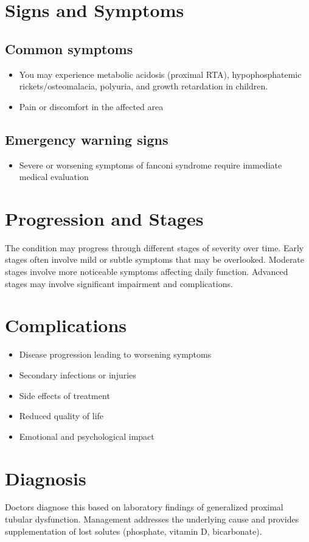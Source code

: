 \section{Signs and Symptoms}

\subsection{Common symptoms}
\begin{itemize}[noitemsep]
  \item You may experience metabolic acidosis (proximal RTA), hypophosphatemic rickets/osteomalacia, polyuria, and growth retardation in children.

  \item Pain or discomfort in the affected area
  \end{itemize}

\subsection{Emergency warning signs}
\begin{itemize}[noitemsep]
  \item Severe or worsening symptoms of fanconi syndrome require immediate medical evaluation
\end{itemize}
\section{Progression and Stages}
The condition may progress through different stages of severity over time. Early stages often involve mild or subtle symptoms that may be overlooked. Moderate stages involve more noticeable symptoms affecting daily function. Advanced stages may involve significant impairment and complications.
\section{Complications}
\begin{itemize}[noitemsep]
  \item Disease progression leading to worsening symptoms
  \item Secondary infections or injuries
  \item Side effects of treatment
  \item Reduced quality of life
  \item Emotional and psychological impact
\end{itemize}
\section{Diagnosis}
Doctors diagnose this based on laboratory findings of generalized proximal tubular dysfunction. Management addresses the underlying cause and provides supplementation of lost solutes (phosphate, vitamin D, bicarbonate).

